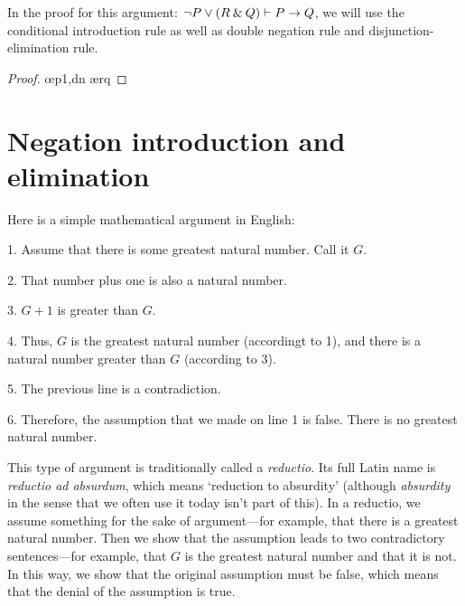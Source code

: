 \begin{earg}
\item In the proof for this argument: ${\neg} P \vee (R \mathbin{\&} Q) \vdash P \rightarrow Q$, we will use the conditional introduction rule as well as double negation rule and disjunction-elimination rule. 

\begin{proof}
	 \pr{}	
	\open
		\as{}
		 
		 \oe{p1,dn}
		 \ae{rq}
	\close
\end{proof}


\end{earg}


\section{Negation introduction and elimination}

Here is a simple mathematical argument in English:
\begin{earg}
\item[1.] Assume that there is some greatest natural number. Call it $G$.
\item[2.] That number plus one is also a natural number.
\item[3.] $G+1$ is greater than $G$.
\item[4.] Thus, $G$ is the greatest natural number (accordingt to 1), and there is a natural number greater than $G$ (according to 3).
\item[5.] The previous line is a contradiction.
\item[6.] Therefore, the assumption that we made on line 1 is false. There is no greatest natural number.
\end{earg}
This type of argument is traditionally called a \emph{reductio}. Its full Latin name is \emph{reductio ad absurdum}, which means `reduction to absurdity' (although \textit{absurdity} in the sense that we often use it today isn't part of this). In a reductio, we assume something for the sake of argument---for example, that there is a greatest natural number. Then we show that the assumption leads to two contradictory sentences---for example, that $G$ is the greatest natural number and that it is not. In this way, we show that the original assumption must be false, which means that the denial of the assumption is true. 

